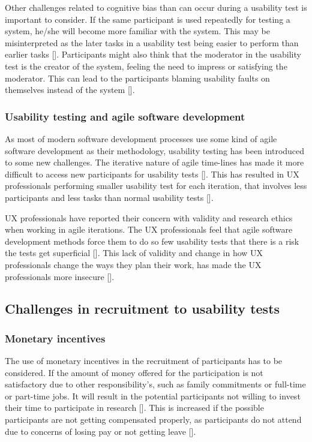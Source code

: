 Other challenges related to cognitive bias than can occur during a usability test is important to consider. If the same participant is used repeatedly for testing a system, he/she will become more familiar with the system. This may be misinterpreted as the later tasks in a usability test being easier to perform than earlier tasks [\cite{dn_2016}]. Participants might also think that the moderator in the usability test is the creator of the system, feeling the need to impress or satisfying the moderator. This can lead to the participants blaming usability faults on themselves instead of the system [\cite{dn_2016}].

\subsubsection{Usability testing and agile software development}
As most of modern software development processes use some kind of agile software development as their methodology, usability testing has been introduced to some new challenges. The iterative nature of agile time-lines has made it more difficult to access new participants for usability tests [\cite{ds_2014}]. This has resulted in UX professionals performing smaller usability test for each iteration, that involves less participants and less tasks than normal usability tests [\cite{ln_2012}].

UX professionals have reported their concern with validity and research ethics when working in agile iterations. The UX professionals feel that agile software development methods force them to do so few usability tests that there is a risk the tests get superficial [\cite{ln_2012}]. This lack of validity and change in how UX professionals change the ways they plan their work, has made the UX professionals more insecure [\cite{ln_2012}].

\subsection{Challenges in recruitment to usability tests}

\subsubsection{Monetary incentives} \label{sec:monetary-incentives}
The use of monetary incentives in the recruitment of participants has to be considered. If the amount of money offered for the participation is not satisfactory due to other responsibility's, such as family commitments or full-time or part-time jobs. It will result in the potential participants not willing to invest their time to participate in research [\cite{pkf_2018}]. This is increased if the possible participants are not getting compensated properly, as participants do not attend due to concerns of losing pay or not getting leave [\cite{nc_2020}].

